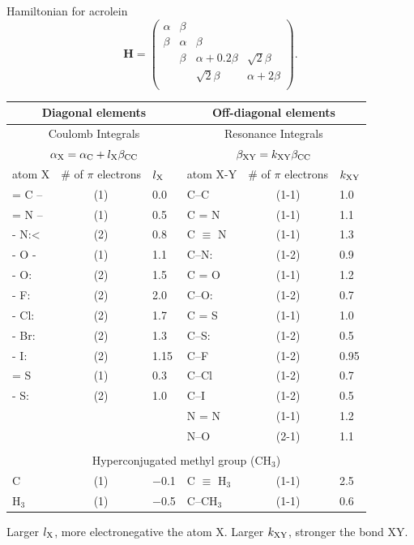 \documentclass[../Main/chem532-notes.tex]{subfiles}
\begin{document}
Hamiltonian for acrolein
\begin{equation}
\mathbf{H}
=
\begin{pmatrix}
\alpha & \beta & & \\
\beta & \alpha & \beta & \\
& \beta & \alpha + 0.2 \beta & \sqrt{2} \beta \\
& &  \sqrt{2} \beta & \alpha + 2 \beta \\
\end{pmatrix}.
\end{equation}

\begin{table}[h!]
   \centering
   \begin{tabular}{@{} lcllcl @{}} %
      \toprule
	\multicolumn{3}{c}{Diagonal elements} & \multicolumn{3}{c}{Off-diagonal elements} \\
	\midrule
	\multicolumn{3}{c}{Coulomb Integrals} & \multicolumn{3}{c}{Resonance Integrals}\\
	\multicolumn{3}{c}{$\alpha_{\rm X} = \alpha_{\rm C} + l_{\rm X} \beta_{\rm CC}$}
	& \multicolumn{3}{c}{$\beta_{\rm XY} = k_{\rm XY} \beta_{\rm CC}$}\\
	\midrule
	atom X & \# of $\pi$ electrons & $l_{\rm X}$ & atom X-Y & \# of $\pi$ electrons & $k_{\rm XY}$ \\
	\midrule
	= C -- & (1) & 0.0 & C--C & (1-1) & 1.0 \\
	= N -- & (1) & 0.5 & C = N & (1-1) & 1.1 \\
	- N:< & (2) & 0.8 & C $\equiv$ N & (1-1) & 1.3 \\
	- O - & (1) & 1.1 & C--N: & (1-2) & 0.9 \\
	- O: & (2) & 1.5 & C = O & (1-1) & 1.2 \\
	- F: & (2) & 2.0 & C--O: & (1-2) & 0.7 \\
	- Cl: & (2) & 1.7 & C = S & (1-1) & 1.0 \\
	- Br: & (2) & 1.3 & C--S: & (1-2) & 0.5 \\
	- I: & (2) & 1.15 & C--F & (1-2) & 0.95 \\
	= S & (1) & 0.3 & C--Cl & (1-2) & 0.7 \\
	- S: & (2) & 1.0 & C--I & (1-2) & 0.5 \\
	& & & N = N & (1-1) & 1.2\\
	& & & N--O & (2-1) & 1.1 \\
	\\
	\multicolumn{6}{c}{Hyperconjugated methyl group (CH$_3$)}  \\
	C & (1) & $-$0.1 &  C $\equiv$ H$_3$ & (1-1) & 2.5   \\
	H$_3$ & (1) & $-$0.5 & C--CH$_3$ & (1-1) & 0.6\\
	\bottomrule
   \end{tabular}
   
   Larger $l_{\rm X}$, more electronegative the atom X. Larger $k_{\rm XY}$, stronger the bond XY.
   \label{tab:booktabs}
\end{table}
\end{document}
